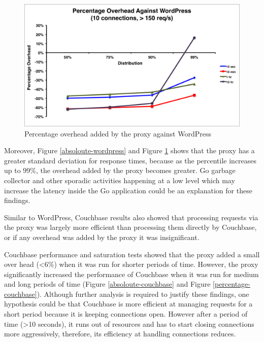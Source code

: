 \documentclass[a4paper,11pt,twoside]{report}
\begin{document}
\begin{figure}[!ht]
  \centering
     \includegraphics[scale=0.55]{percentage-wordpress}
  \caption{Percentage overhead added by the proxy against WordPress}
  \label{percentage-wordpress}
\end{figure} 

Moreover, Figure \ref{absoloute-wordpress} and Figure \ref{percentage-wordpress} shows that the proxy has a greater standard deviation for response times, because as the percentile increases up to 99\%, the overhead added by the proxy becomes greater. Go garbage collector and other sporadic activities happening at a low level which may increase the latency inside the Go application could be an explanation for these findings.

Similar to WordPress, Couchbase results also showed that processing requests via the proxy was largely more efficient than processing them directly by Couchbase, or if any overhead was added by the proxy it was insignificant.

Couchbase performance and saturation tests showed that the proxy added a small over head (<6\%) when it was run for shorter periods of time.  However, the proxy significantly increased the performance of Couchbase when it was run for medium and long periods of time (Figure \ref{absoloute-couchbase} and Figure \ref{percentage-couchbase}). Although further analysis is required to justify these findings, one hypothesis could be that Couchbase is more efficient at managing requests for a short period because it is keeping connections open. However after a period of time (>10 seconds), it runs out of resources and has to start closing connections more aggressively, therefore, its efficiency at handling connections reduces.
\end{document}
